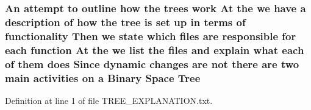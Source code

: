 \subsubsection[{Tree}]{\setlength{\rightskip}{0pt plus 5cm}An attempt to outline how the trees work At the we have a description of how the tree is {\bf set} up in terms of functionality Then we state which files are responsible for each function At the we list the files and explain what each of them does Since dynamic changes are not there are two main activities on a Binary Space Tree}\label{TREE__EXPLANATION_8txt_acb8010dba0cbb36077c0b765e86d0891}


Definition at line 1 of file T\-R\-E\-E\-\_\-\-E\-X\-P\-L\-A\-N\-A\-T\-I\-O\-N.\-txt.

